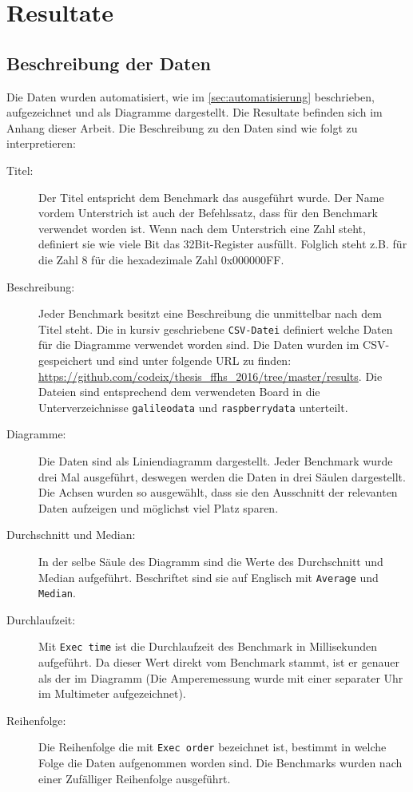 \chapter{Resultate}

\section{Beschreibung der Daten}

Die Daten wurden automatisiert, wie im \autoref{sec:automatisierung} beschrieben, aufgezeichnet und als Diagramme dargestellt. Die Resultate befinden sich im Anhang dieser Arbeit. Die Beschreibung zu den Daten sind wie folgt zu interpretieren:

\begin{description}
\item[Titel:]
Der Titel entspricht dem Benchmark das ausgeführt wurde. Der Name vordem Unterstrich ist auch der Befehlssatz, dass für den Benchmark verwendet worden ist. Wenn nach dem Unterstrich eine Zahl steht, definiert sie wie viele Bit das 32Bit-Register ausfüllt. Folglich steht z.B. für die Zahl 8 für die hexadezimale Zahl 0x000000FF.
\item[Beschreibung:]
Jeder Benchmark besitzt eine Beschreibung die unmittelbar nach dem Titel steht. Die in kursiv geschriebene \texttt{CSV-Datei} definiert welche Daten für die Diagramme verwendet worden sind. Die Daten wurden im CSV-gespeichert und sind unter folgende URL zu finden: \url{https://github.com/codeix/thesis_ffhs_2016/tree/master/results}. Die Dateien sind entsprechend dem verwendeten Board in die Unterverzeichnisse \texttt{galileodata} und \texttt{raspberrydata} unterteilt. 
\item[Diagramme:]
Die Daten sind als Liniendiagramm dargestellt. Jeder Benchmark wurde drei Mal ausgeführt, deswegen werden die Daten in drei Säulen dargestellt. Die Achsen wurden so ausgewählt, dass sie den Ausschnitt der relevanten Daten aufzeigen und möglichst viel Platz sparen.
\item[Durchschnitt und Median:]
In der selbe Säule des Diagramm sind die Werte des Durchschnitt und Median aufgeführt. Beschriftet sind sie auf Englisch mit \texttt{Average} und \texttt{Median}.
\item[Durchlaufzeit:]
Mit \texttt{Exec time} ist die Durchlaufzeit des Benchmark in Millisekunden aufgeführt. Da dieser Wert direkt vom Benchmark stammt, ist er genauer als der im Diagramm (Die Amperemessung wurde mit einer separater Uhr im Multimeter aufgezeichnet).
\item[Reihenfolge:] Die Reihenfolge die mit \texttt{Exec order} bezeichnet ist, bestimmt in welche Folge die Daten aufgenommen worden sind. Die Benchmarks wurden nach einer Zufälliger Reihenfolge ausgeführt.

\end{description}



